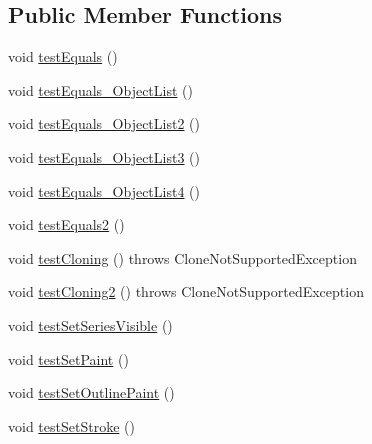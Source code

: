 \subsection*{Public Member Functions}
\begin{DoxyCompactItemize}
\item 
void \mbox{\hyperlink{classorg_1_1jfree_1_1chart_1_1renderer_1_1_abstract_renderer_test_afc7d62ece8a3147370be52b6ef836db0}{test\+Equals}} ()
\item 
void \mbox{\hyperlink{classorg_1_1jfree_1_1chart_1_1renderer_1_1_abstract_renderer_test_a7d43f1f0f644411fb4bded68287829bd}{test\+Equals\+\_\+\+Object\+List}} ()
\item 
void \mbox{\hyperlink{classorg_1_1jfree_1_1chart_1_1renderer_1_1_abstract_renderer_test_a352dfffa30fee1cc03c2fca9987c0df8}{test\+Equals\+\_\+\+Object\+List2}} ()
\item 
void \mbox{\hyperlink{classorg_1_1jfree_1_1chart_1_1renderer_1_1_abstract_renderer_test_a11fa0813153649f0183c280e38897511}{test\+Equals\+\_\+\+Object\+List3}} ()
\item 
void \mbox{\hyperlink{classorg_1_1jfree_1_1chart_1_1renderer_1_1_abstract_renderer_test_a166b585799dd9e28948b6f3b366e514a}{test\+Equals\+\_\+\+Object\+List4}} ()
\item 
void \mbox{\hyperlink{classorg_1_1jfree_1_1chart_1_1renderer_1_1_abstract_renderer_test_a300128748623caa9c81823869df780f9}{test\+Equals2}} ()
\item 
void \mbox{\hyperlink{classorg_1_1jfree_1_1chart_1_1renderer_1_1_abstract_renderer_test_a60de1b8130c50c9f42ef75e7efae5e78}{test\+Cloning}} ()  throws Clone\+Not\+Supported\+Exception 
\item 
void \mbox{\hyperlink{classorg_1_1jfree_1_1chart_1_1renderer_1_1_abstract_renderer_test_a16ee3e2a076b305c37e7216967a3d4eb}{test\+Cloning2}} ()  throws Clone\+Not\+Supported\+Exception 
\item 
void \mbox{\hyperlink{classorg_1_1jfree_1_1chart_1_1renderer_1_1_abstract_renderer_test_a98074b73be2ad95b9b9aa17d7a032a1b}{test\+Set\+Series\+Visible}} ()
\item 
void \mbox{\hyperlink{classorg_1_1jfree_1_1chart_1_1renderer_1_1_abstract_renderer_test_a3d0e6c3e101daf6f0f6c3baf39c78ef9}{test\+Set\+Paint}} ()
\item 
void \mbox{\hyperlink{classorg_1_1jfree_1_1chart_1_1renderer_1_1_abstract_renderer_test_aa1a4549f4cfceb3cf193a4edd1d73b26}{test\+Set\+Outline\+Paint}} ()
\item 
void \mbox{\hyperlink{classorg_1_1jfree_1_1chart_1_1renderer_1_1_abstract_renderer_test_a07a0b3ca25f8f7c31c1f56329f6e0fc8}{test\+Set\+Stroke}} ()

\end{DoxyCompactItemize}
